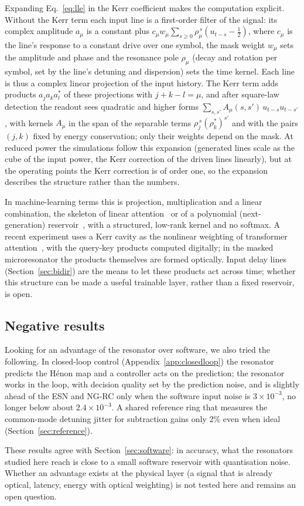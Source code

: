 Expanding Eq.~\eqref{eq:lle} in the Kerr coefficient makes the computation explicit. Without the Kerr term each input line is a
first-order filter of the signal: its complex amplitude $a_\mu$ is a constant plus
$c_\mu w_\mu\sum_{s\ge0}\rho_\mu^{\,s}(u_{t-s}-\tfrac12)$, where $c_\mu$ is the line's response to a constant drive over one symbol, the
mask
weight $w_\mu$ sets the amplitude and phase and the resonance pole $\rho_\mu$ (decay and rotation per symbol, set by the line's
detuning and dispersion) sets the time kernel. Each line is thus a complex linear projection of the input history. The Kerr term adds
products $a_ja_ka_l^*$ of these projections with $j+k-l=\mu$, and after square-law detection the readout sees quadratic and
higher forms $\sum_{s,s'}A_\mu(s,s')\,u_{t-s}u_{t-s'}$, with kernels $A_\mu$ in the span of the separable terms
$\rho_j^{\,s}(\rho_k^*)^{s'}$ and with the pairs $(j,k)$ fixed by energy conservation; only their weights depend on the mask. At reduced
power the simulations follow this expansion (generated lines scale as the cube of the input power, the Kerr correction of the driven
lines linearly), but at the operating points the Kerr correction is of order one, so the expansion describes the structure rather
than the numbers.

In machine-learning terms this is projection, multiplication and a linear combination, the skeleton of linear
attention~\cite{vaswani2017,katharopoulos2020} or of a polynomial (next-generation) reservoir~\cite{gauthier2021,wang2025ngrc}, with a structured,
low-rank kernel and no softmax. A recent experiment uses a Kerr cavity as the nonlinear weighting of transformer
attention~\cite{williams2026}, with the query-key products computed digitally; in the masked microresonator the products themselves
are formed optically. Input delay lines (Section~\ref{sec:bidir}) are the means to let these products act across time; whether this
structure can be made a useful trainable layer, rather than a fixed reservoir, is open.

\subsection{Negative results}

Looking for an advantage of the resonator over software, we also tried the following. In closed-loop control (Appendix~\ref{app:closedloop}) the resonator predicts the Hénon map and a controller acts on
the prediction; the resonator works in the loop, with decision quality set by the prediction noise, and is slightly ahead of the ESN
and NG-RC only when the software input noise is $3\times10^{-3}$, no longer below about $2.4\times10^{-3}$. A shared reference ring
that measures the common-mode detuning jitter for subtraction gains only 2\% even when ideal (Section~\ref{sec:reference}).

These results agree with Section~\ref{sec:software}: in accuracy, what the resonators studied here reach is close to a small software
reservoir with quantisation noise. Whether an advantage exists at the physical layer (a signal that is already optical, latency,
energy with optical weighting) is not tested here and remains an open question.
